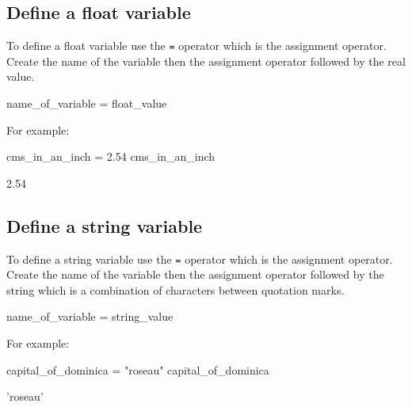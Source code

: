 \subsection{Define a float variable}
\label{\detokenize{building-tools/01-variables-conditionals-loops/how/main:define-a-float-variable}}

To define a float variable use the \texttt{=} operator which is the assignment
operator. Create the name of the variable then the assignment operator
followed by the real value.


\begin{pyin}
name_of_variable = float_value
\end{pyin}



For example:




\begin{pyin}
cms_in_an_inch = 2.54
cms_in_an_inch
\end{pyin}





\begin{raw}
2.54
\end{raw}





\subsection{Define a string variable}
\label{\detokenize{building-tools/01-variables-conditionals-loops/how/main:define-a-string-variable}}

To define a string variable use the \texttt{=} operator which is the assignment
operator. Create the name of the variable then the assignment operator
followed by the string which is a combination of characters between quotation
marks.


\begin{pyin}
name_of_variable = string_value
\end{pyin}



For example:




\begin{pyin}
capital_of_dominica = "roseau"
capital_of_dominica
\end{pyin}





\begin{raw}
'roseau'
\end{raw}





